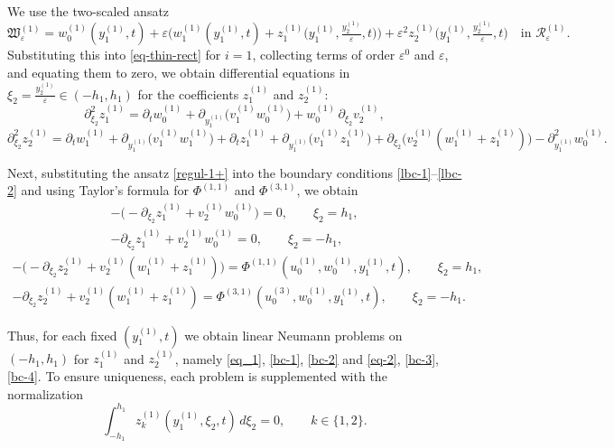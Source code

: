 \documentclass[reqno]{amsart}            %
\numberwithin{equation}{section}
\begin{document}
	We use the two-scaled ansatz
	\begin{equation}\label{regul-1+}
		\mathfrak{W}^{(1)}_\varepsilon =
		w_0^{(1)}(y^{(1)}_1,t)
		+ \varepsilon\Big(w_1^{(1)}(y^{(1)}_1,t)
		+ z_1^{(1)}\big(y^{(1)}_1,\tfrac{y^{(1)}_2}{\varepsilon},t\big)\Big)
		+ \varepsilon^2 z_2^{(1)}\big(y^{(1)}_1,\tfrac{y^{(1)}_2}{\varepsilon},t\big)
		\quad\text{in }\mathcal{R}^{(1)}_\varepsilon.
	\end{equation}
	Substituting this into \eqref{eq-thin-rect} for $i=1$, collecting terms of order $\varepsilon^0$ and $\varepsilon$, and equating them to zero, we obtain differential equations in $\xi_2=\tfrac{y^{(1)}_2}{\varepsilon}\in(-h_1,h_1)$ for the coefficients $z_1^{(1)}$ and $z_2^{(1)}$:
	\begin{equation}\label{eq_1}
		\partial_{\xi_2}^2 z^{(1)}_1
		= \partial_t w^{(1)}_0
		+ \partial_{y^{(1)}_1}\!\big(v_1^{(1)} w^{(1)}_0\big)
		+ w^{(1)}_0\,\partial_{\xi_2}v_2^{(1)},
	\end{equation}
	\begin{equation}\label{eq-2}
		\partial_{\xi_2}^2 z^{(1)}_2
		= \partial_t w^{(1)}_1
		+ \partial_{y^{(1)}_1}\!\big(v_1^{(1)} w^{(1)}_1\big)
		+ \partial_t z^{(1)}_1
		+ \partial_{y^{(1)}_1}\!\big(v_1^{(1)} z^{(1)}_1\big)
		+ \partial_{\xi_2}\!\big(v_2^{(1)}(w^{(1)}_1 + z^{(1)}_1)\big)
		- \partial_{y^{(1)}_1}^2 w^{(1)}_0.
	\end{equation}
	
	Next, substituting the ansatz \eqref{regul-1+} into the boundary conditions \eqref{lbc-1}–\eqref{lbc-2} and using Taylor’s formula for $\Phi^{(1,1)}$ and $\Phi^{(3,1)}$, we obtain
	\begin{gather}\label{bc-1}
		-\big(-\partial_{\xi_2}z^{(1)}_1 + v_2^{(1)} w^{(1)}_0\big)=0,
		\qquad \xi_2=h_1,
		\\[2mm]\label{bc-2}
		-\partial_{\xi_2}z^{(1)}_1 + v_2^{(1)} w^{(1)}_0 = 0,
		\qquad \xi_2=-h_1,
	\end{gather}
	\begin{gather}\label{bc-3}
		-\big(-\partial_{\xi_2}z^{(1)}_2 + v_2^{(1)}(w^{(1)}_1 + z^{(1)}_1)\big)
		= \Phi^{(1,1)}(u^{(1)}_0,w^{(1)}_0,y^{(1)}_1,t),
		\qquad \xi_2=h_1,
		\\[2mm]\label{bc-4}
		-\partial_{\xi_2}z^{(1)}_2 + v_2^{(1)}(w^{(1)}_1 + z^{(1)}_1)
		= \Phi^{(3,1)}(u^{(3)}_0,w^{(1)}_0,y^{(1)}_1,t),
		\qquad \xi_2=-h_1.
	\end{gather}
	
	Thus, for each fixed $(y^{(1)}_1,t)$ we obtain linear Neumann problems on $(-h_1,h_1)$ for $z_1^{(1)}$ and $z_2^{(1)}$, namely \eqref{eq_1}, \eqref{bc-1}, \eqref{bc-2} and \eqref{eq-2}, \eqref{bc-3}, \eqref{bc-4}.  
	To ensure uniqueness, each problem is supplemented with the normalization
	\begin{equation}\label{uniq_1}
		\int_{-h_1}^{h_1} z_k^{(1)}(y^{(1)}_1,\xi_2,t)\,d\xi_2 = 0,
		\qquad k\in\{1,2\}.
	\end{equation}
	
\end{document}

